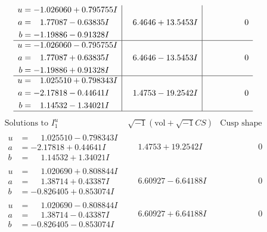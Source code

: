 \documentclass[1p]{elsarticle_modified}
\theoremstyle{definition}
\newcommand{\I}{\sqrt{-1}}
\begin{document}
$$\begin{array}{c|c|c}
\begin{aligned}
u &= -1.026060 + 0.795755 I \\
a &= \phantom{-}1.77087 - 0.63835 I \\
b &= -1.19886 - 0.91328 I\end{aligned}
 & \phantom{-}6.4646 + 13.5453 I & \phantom{-0.000000 } 0 \\ \hline\begin{aligned}
u &= -1.026060 - 0.795755 I \\
a &= \phantom{-}1.77087 + 0.63835 I \\
b &= -1.19886 + 0.91328 I\end{aligned}
 & \phantom{-}6.4646 - 13.5453 I & \phantom{-0.000000 } 0 \\ \hline\begin{aligned}
u &= \phantom{-}1.025510 + 0.798343 I \\
a &= -2.17818 - 0.44641 I \\
b &= \phantom{-}1.14532 - 1.34021 I\end{aligned}
 & \phantom{-}1.4753 - 19.2542 I & \phantom{-0.000000 } 0\\
 \hline 
 \end{array}$$\newpage$$\begin{array}{c|c|c}  
\text{Solutions to }I^u_{1}& \I (\text{vol} + \sqrt{-1}CS) & \text{Cusp shape}\\
 \hline 
\begin{aligned}
u &= \phantom{-}1.025510 - 0.798343 I \\
a &= -2.17818 + 0.44641 I \\
b &= \phantom{-}1.14532 + 1.34021 I\end{aligned}
 & \phantom{-}1.4753 + 19.2542 I & \phantom{-0.000000 } 0 \\ \hline\begin{aligned}
u &= \phantom{-}1.020690 + 0.808844 I \\
a &= \phantom{-}1.38714 + 0.43387 I \\
b &= -0.826405 + 0.853074 I\end{aligned}
 & \phantom{-}6.60927 - 6.64188 I & \phantom{-0.000000 } 0 \\ \hline\begin{aligned}
u &= \phantom{-}1.020690 - 0.808844 I \\
a &= \phantom{-}1.38714 - 0.43387 I \\
b &= -0.826405 - 0.853074 I\end{aligned}
 & \phantom{-}6.60927 + 6.64188 I & \phantom{-0.000000 } 0 \\ \hline\begin{aligned}

\end{aligned}
\end{array}$$
\end{document}
